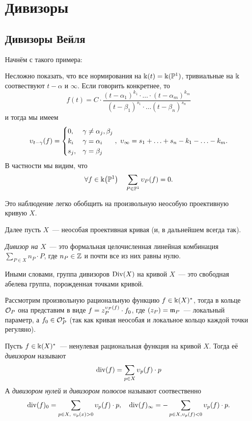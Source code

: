     \section{Дивизоры}
    
	\subsection{Дивизоры Вейля}

	Начнём с такого примера: 

	\begin{example}
		Несложно показать, что все нормирования на $\Bbbk(t) = \Bbbk(\mathbb{P}^1)$, тривиальные на $\Bbbk$ соотвествуют $t - \alpha$ и $\infty$. Если говорить конкретнее, то 
		\[
			f(t) = C \cdot \frac{(t - \alpha_1)^{k_1} \cdot \ldots \cdot (t - \alpha_m)^{k_m}}{(t - \beta_1)^{s_1} \cdot \ldots (t - \beta_n)^{s_n}}
		\]
		и тогда мы имеем 
		\[
			\upsilon_{t - \gamma}(f) = \begin{cases} 0, & \gamma \neq \alpha_j, \beta_j \\ k_i & \gamma = \alpha_i  \\ s_j, & \gamma = \beta_j \end{cases}, \ \upsilon_{\infty} = s_1 + \ldots + s_n - k_1 - \ldots - k_m.
		\]
		В частности мы видим, что 
		\[
			\forall f \in \bk\lr*{\PP^1} \quad \sum_{P \in \PP^1} \v_P(f) = 0.
		\]

		Это наблюдение легко обобщить на произвольную неособую проективную кривую $X$. 
	\end{example}

	Далее пусть $X$~--- неособая проективная кривая (и, в дальнейшем всегда так). 
	\begin{definition} 
		\emph{Дивизор на $X$}~--- это формальная целочисленная линейная комбинация $\sum_{P \in X} n_P \cdot P$, где $n_P \in \mathbb{Z}$ и почти все из них равны нулю. 

		Иными словами, группа дивизоров $\operatorname{Div}(X)$ на кривой $X$~--- это свободная абелева группа, порожденная точками кривой. 
	\end{definition}

	Рассмотрим произвольную рациональную функцию $f \in \Bbbk(X)^*$, тогда в кольце $\mathcal{O}_P$ она представим в виде $f = z_P^{\upsilon_P(f)} \cdot f_0$, где $(z_P) = \mathfrak{m}_P$~--- локальный параметр, а $f_0 \in \mathcal{O}_P^{*}$ (так как кривая неособая и локальное кольцо каждой точки регуляно). 


	\begin{definition} 
		Пусть $f \in \Bbbk(X)^*$~--- ненулевая рациональная функция на кривой $X$. Тогда её \emph{дивизором} называют 
		\[
			\operatorname{div}(f) = \sum_{p \in X} \upsilon_p(f) \cdot p 
		\]
		А  \emph{дивизором нулей} и \emph{дивизором полюсов} называют соотвественно 
		\[
			\Div(f)_0 = \sum_{p \in X, \ \v_p(x) > 0} \v_p(f) \cdot p, \quad \Div(f)_{\infty} = - \sum_{p \in X, \v_p(f) < 0} \v_p(f) \cdot p.
		\]
	\end{definition}

